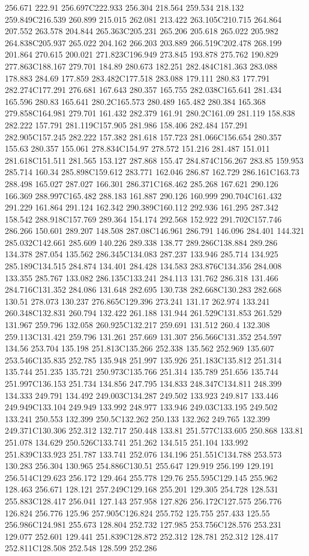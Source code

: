 256.671 222.91 256.697C222.933 256.304 218.564 259.534 218.132 259.849C216.539 260.899 215.015 262.081 213.422 263.105C210.715 264.864 207.552 263.578 204.844 265.363C205.231 265.206 205.618 265.022 205.982 264.838C205.937 265.022 204.162 266.203 203.889 266.519C202.478 268.199 201.864 270.615 200.021 271.823C196.949 273.845 193.878 275.762 190.829 277.863C188.167 279.701 184.89 280.673 182.251 282.484C181.363 283.088 178.883 284.69 177.859 283.482C177.518 283.088 179.111 280.83 177.791 282.274C177.291 276.681 167.643 280.357 165.755 282.038C165.641 281.434 165.596 280.83 165.641 280.2C165.573 280.489 165.482 280.384 165.368 279.858C164.981 279.701 161.432 282.379 161.91 280.2C161.09 281.119 158.838 282.222 157.791 281.119C157.905 281.986 158.406 282.484 157.291 282.905C157.245 282.222 157.382 281.618 157.723 281.066C156.654 280.357 155.63 280.357 155.061 278.834C154.97 278.572 151.216 281.487 151.011 281.618C151.511 281.565 153.127 287.868 155.47 284.874C156.267 283.85 159.953 285.714 160.34 285.898C159.612 283.771 162.046 286.87 162.729 286.161C163.73 288.498 165.027 287.027 166.301 286.371C168.462 285.268 167.621 290.126 166.369 288.997C165.482 288.183 161.887 290.126 160.999 290.704C161.432 291.229 161.864 291.124 162.342 290.389C160.112 292.936 161.295 287.342 158.542 288.918C157.769 289.364 154.174 292.568 152.922 291.702C157.746 286.266 150.601 289.207 148.508 287.08C146.961 286.791 146.096 284.401 144.321 285.032C142.661 285.609 140.226 289.338 138.77 289.286C138.884 289.286 134.378 287.054 135.562 286.345C134.083 287.237 133.946 285.714 134.925 285.189C134.515 284.874 134.401 284.428 134.583 283.876C134.356 284.008 133.355 285.767 133.082 286.135C133.241 284.113 131.762 286.318 131.466 284.716C131.352 284.086 131.648 282.695 130.738 282.668C130.283 282.668 130.51 278.073 130.237 276.865C129.396 273.241 131.17 262.974 133.241 260.348C132.831 260.794 132.422 261.188 131.944 261.529C131.853 261.529 131.967 259.796 132.058 260.925C132.217 259.691 131.512 260.4 132.308 259.113C131.421 259.796 131.261 257.669 131.307 256.566C131.352 254.597 134.56 253.704 135.198 251.813C135.266 252.338 135.562 252.969 135.607 253.546C135.835 252.785 135.948 251.997 135.926 251.183C135.812 251.314 135.744 251.235 135.721 250.973C135.766 251.314 135.789 251.656 135.744 251.997C136.153 251.734 134.856 247.795 134.833 248.347C134.811 248.399 134.333 249.791 134.492 249.003C134.287 249.502 133.923 249.817 133.446 249.949C133.104 249.949 133.992 248.977 133.946 249.03C133.195 249.502 133.241 250.553 132.399 250.5C132.262 250.133 132.262 249.765 132.399 249.371C130.306 252.312 132.717 250.448 133.81 251.577C133.605 250.868 133.81 251.078 134.629 250.526C133.741 251.262 134.515 251.104 133.992 251.839C133.923 251.787 133.741 252.076 134.196 251.551C134.788 253.573 130.283 256.304 130.965 254.886C130.51 255.647 129.919 256.199 129.191 256.514C129.623 256.172 129.464 255.778 129.76 255.595C129.145 255.962 128.463 256.671 128.121 257.249C129.168 255.201 129.305 254.728 128.531 255.883C128.417 256.041 127.143 257.958 127.826 256.172C127.575 256.776 126.824 256.776 125.96 257.905C126.824 255.752 125.755 257.433 125.55 256.986C124.981 255.673 128.804 252.732 127.985 253.756C128.576 253.231 129.077 252.601 129.441 251.839C128.872 252.312 128.781 252.312 128.417 252.811C128.508 252.548 128.599 252.286 